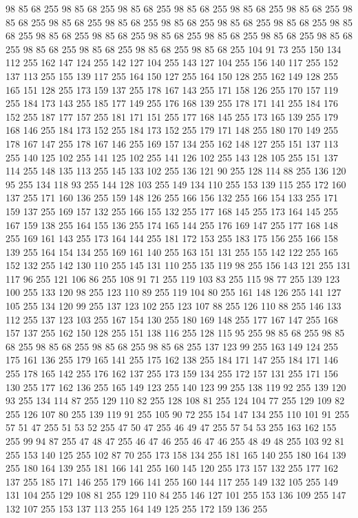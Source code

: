98 85 68 255 98 85 68 255 98 85 68 255 98 85 68 255 98 85 68 255 98 85 68 255 98 85 68 255 98 85 68 255 98 85 68 255 98 85 68 255 98 85 68 255 98 85 68 255 98 85 68 255 98 85 68 255 98 85 68 255 98 85 68 255 98 85 68 255 98 85 68 255 98 85 68 255 98 85 68 255 98 85 68 255 98 85 68 255 98 85 68 255 104 91 73 255 150 134 112 255 162 147 124 255 142 127 104 255 143 127 104 255 156 140 117 255 152 137 113 255 155 139 117 255 164 150 127 255 164 150 128 255 162 149 128 255 165 151 128 255 173 159 137 255 178 167 143 255 171 158 126 255 170 157 119 255 184 173 143 255 185 177 149 255 176 168 139 255 178 171 141 255 184 176 152 255 187 177 157 255 181 171 151 255 177 168 145 255 173 165 139 255 179 168 146 255 184 173 152 255 184 173 152 255 179 171 148 255 180 170 149 255 178 167 147 255 178 167 146 255 169 157 134 255 162 148 127 255 151 137 113 255 140 125 102 255 141 125 102 255 141 126 102 255 143 128 105 255 151 137 114 255 148 135 113 255
145 133 102 255 136 121 90 255 128 114 88 255 136 120 95 255 134 118 93 255 144 128 103 255 149 134 110 255 153 139 115 255 172 160 137 255 171 160 136 255 159 148 126 255 166 156 132 255 166 154 133 255 171 159 137 255 169 157 132 255 166 155 132 255 177 168 145 255 173 164 145 255 167 159 138 255 164 155 136 255 174 165 144 255 176 169 147 255 177 168 148 255 169 161 143 255 173 164 144 255 181 172 153 255 183 175 156 255 166 158 139 255 164 154 134 255 169 161 140 255 163 151 131 255 155 142 122 255 165 152 132 255 142 130 110 255 145 131 110 255 135 119 98 255 156 143 121 255 131 117 96 255 121 106 86 255 108 91 71 255 119 103 83 255 115 98 77 255 139 123 100 255 133 120 98 255 123 110 89 255 119 104 80 255 161 148 126 255 141 127 105 255 134 120 99 255 137 123 102 255 123 107 88 255 126 110 88 255 146 133 112 255 137 123 103 255 167 154 130 255 180 169 148 255 177 167 147 255 168 157 137 255 162 150 128 255 151 138 116 255 128 115 95 255 98 85 68 255 98 85 68 255 98 85 68 255
98 85 68 255 98 85 68 255 137 123 99 255 163 149 124 255 175 161 136 255 179 165 141 255 175 162 138 255 184 171 147 255 184 171 146 255 178 165 142 255 176 162 137 255 173 159 134 255 172 157 131 255 171 156 130 255 177 162 136 255 165 149 123 255 140 123 99 255 138 119 92 255 139 120 93 255 134 114 87 255 129 110 82 255 128 108 81 255 124 104 77 255 129 109 82 255 126 107 80 255 139 119 91 255 105 90 72 255 154 147 134 255 110 101 91 255 57 51 47 255 51 53 52 255 47 50 47 255 46 49 47 255 57 54 53 255 163 162 155 255 99 94 87 255 47 48 47 255 46 47 46 255 46 47 46 255 48 49 48 255 103 92 81 255 153 140 125 255 102 87 70 255 173 158 134 255 181 165 140 255 180 164 139 255 180 164 139 255 181 166 141 255 160 145 120 255 173 157 132 255 177 162 137 255 185 171 146 255 179 166 141 255 160 144 117 255 149 132 105 255 149 131 104 255 129 108 81 255 129 110 84 255 146 127 101 255 153 136 109 255 147 132 107 255 153 137 113 255 164 149 125 255 172 159 136 255
